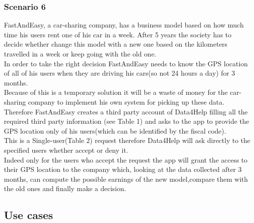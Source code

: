     \subsubsection{Scenario 6}
    FastAndEasy, a car-sharing company, has a business model based on how much time his users rent one of his car in a week. After 5 years the society has to decide whether change this model with a new one based on the kilometers travelled in a week or keep going with the old one. \\In order to take the right decision FastAndEasy needs to know the GPS location of all of his users when they are driving his cars(so not 24 hours a day) for 3 months.\\ Because of this is a temporary solution it will be a waste of money for the car-sharing company to implement his own system for picking up these data. Therefore FastAndEasy creates a third party account of Data4Help filling all the required third party information (see Table 1) and asks to the app to provide the GPS location only of his users(which can be identified by the fiscal code).\\ This is a Single-user(Table 2) request therefore  Data4Help will ask directly to the specified users whether accept or deny it.\\ Indeed only for the users who accept the request the app will grant the access to their GPS location to the company which,  looking at the data collected after 3 months, can compute the possible earnings of the new model,compare them with the old ones and finally make a decision.



  \subsection{Use cases}



